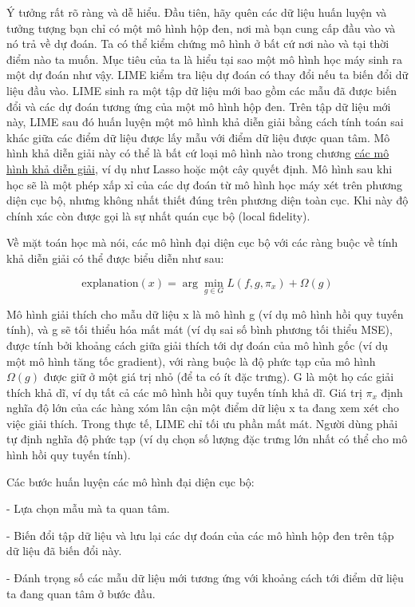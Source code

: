 Ý tưởng rất rõ ràng và dễ hiểu. Đầu tiên, hãy quên các dữ liệu huấn luyện và tưởng tượng bạn chỉ có một mô hình hộp đen, nơi mà bạn cung cấp đầu vào và nó trả về dự đoán. Ta có thể kiểm chứng mô hình ở bất cứ nơi nào và tại thời điểm nào ta muốn. Mục tiêu của ta là hiểu tại sao một mô hình học máy sinh ra một dự đoán như vậy. LIME kiểm tra liệu dự đoán có thay đổi nếu ta biến đổi dữ liệu đầu vào. LIME sinh ra một tập dữ liệu mới bao gồm các mẫu đã được biến đổi và các dự đoán tương ứng của một mô hình hộp đen. Trên tập dữ liệu mới này, LIME sau đó huấn luyện một mô hình khả diễn giải bằng cách tính toán sai khác giữa các điểm dữ liệu được lấy mẫu với điểm dữ liệu được quan tâm. Mô hình khả diễn giải này có thể là bất cứ loại mô hình nào trong chương \href{https://christophm.github.io/interpretable-ml-book/simple.html#simple}{các mô hình khả diễn giải}, ví dụ như Lasso hoặc một cây quyết định. Mô hình sau khi học sẽ là một phép xấp xỉ của các dự đoán từ mô hình học máy xét trên phương diện cục bộ, nhưng không nhất thiết đúng trên phương diện toàn cục. Khi này độ chính xác còn được gọi là sự nhất quán cục bộ (local fidelity).

Về mặt toán học mà nói, các mô hình đại diện cục bộ với các ràng buộc về tính khả diễn giải có thể được biểu diễn như sau:

$$\text{explanation}(x)=\arg\min_{g\in{}G}L(f,g,\pi_x)+\Omega(g)$$

Mô hình giải thích cho mẫu dữ liệu x là mô hình g (ví dụ mô hình hồi quy tuyến tính), và g sẽ tối thiểu hóa mất mát (ví dụ sai số bình phương tối thiểu MSE), được tính bởi khoảng cách giữa giải thích tới dự đoán của mô hình gốc (ví dụ một mô hình tăng tốc gradient), với ràng buộc là độ phức tạp của mô hình $\Omega(g)$ được giữ ở một giá trị nhỏ (để ta có ít đặc trưng). G là một họ các giải thích khả dĩ, ví dụ tất cả các mô hình hồi quy tuyến tính khả dĩ. Giá trị $\pi_x$ định nghĩa độ lớn của các hàng xóm lân cận một điểm dữ liệu x ta đang xem xét cho việc giải thích. Trong thực tế, LIME chỉ tối ưu phần mất mát. Người dùng phải tự định nghĩa độ phức tạp (ví dụ chọn số lượng đặc trưng lớn nhất có thể cho mô hình hồi quy tuyến tính).

Các bước huấn luyện các mô hình đại diện cục bộ:

- Lựa chọn mẫu mà ta quan tâm.

- Biến đổi tập dữ liệu và lưu lại các dự đoán của các mô hình hộp đen trên tập dữ liệu đã biến đổi này.

- Đánh trọng số các mẫu dữ liệu mới tương ứng với khoảng cách tới điểm dữ liệu ta đang quan tâm ở bước đầu.

